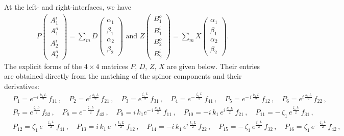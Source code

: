 \documentclass[aps,prb,onecolumn,longbibliography,nofootinbib,citeautoscript,10pt]{revtex4-2}
\def \nn{\nonumber \\}
\def\nn{\nonumber \\}
\def \nn{\nonumber \\}
\begin{document}
At the left- and right-interfaces, we have
\begin{align}
P
\begin{pmatrix}
A_1^i\\
A_1^o\\
A_2^i\\
A_2^o
\end{pmatrix}
=
\sum_m
D \begin{pmatrix}
\alpha_1\\
\beta_1\\
\alpha_2\\
\beta_2
\end{pmatrix} \text{ and }
Z
\begin{pmatrix}
B_1^o\\
B_1^i\\
B_2^o\\
B_2^i\end{pmatrix}=
\sum_m X \begin{pmatrix}
\alpha_1\\
\beta_1\\
\alpha_2\\
\beta_2
\end{pmatrix}.
\end{align}
The explicit forms of the $4\times4$ matrices $P,\, D,\, Z,\, X$ are given below. Their entries are obtained directly from the matching of the spinor components and their derivatives:
\begin{align}
& P_1   = e^{- i \,  \frac{k_1 \, L} {2}} \, f_{11}  \, ,\quad P_2  = e^{ i \, \frac{ k_1 \, L} {2}} \, f_{21}  \, ,\quad P_3  = e^{  \frac{\zeta_1 \,L} {2}} \, f_{31}  \, ,\quad 
P_4 = e^{-\,  \frac{\zeta_1 \,L} {2}} \, f_{41} \,, \quad
P_5  = e^{-\, i \, \frac{ k_1 \, L} {2}} \, f_{12}  \, ,\quad 
P_6  = e^{ i \, \frac{ k_1 \, L} {2}} \, f_{22} \,, 
\nn & P_7 = e^{  \frac{\zeta_1 \,L} {2}} \, f_{32}  \, ,\quad 
P_8  = e^{- \,  \frac{ \zeta_1 \,L} {2}} \, f_{42} \,, \quad
 P_9 =  i \, k_1 e^{- \, i \, \frac{ k_1 \, L} {2}} \, f_{11}  \, ,
\quad P_{10}  = - i \, k_1 \, e^{ i \, \frac{ k_1 \, L} {2}} \, f_{21}  \, ,
\quad P_{11} = - \,\zeta_1 \, e^{  \frac{\zeta_1 \,L} {2}} \, f_{31}  \, ,
\nn & P_{12} = \zeta_1 \, e^{- \,   \frac{\zeta_1 \,L} {2}} \, f_{41} \,, \quad 
P_{13} =  i \, k_1 \, e^{- i \, \frac{ k_1 \, L} {2}} \, f_{12}  \, ,
\quad P_{14}  = - i \, k_1 \, e^{ i \, \frac{ k_1 \, L} {2}} \, f_{22}  \, ,\quad 
P_{15}  = -\, \zeta_1 \, e^{ \frac{\zeta_1 \, L} {2}} \, f_{32} \,,  \quad 
P_{16}  = \zeta_1 \, e^{- \,  \frac{\zeta_1 \, L} {2}} \, f_{42}\,,
\end{align}
\end{document}
